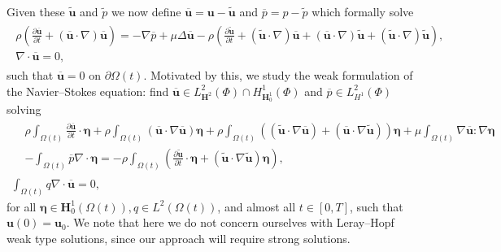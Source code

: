 \documentclass[a4paper]{amsart}
\numberwithin{equation}{section}
\newcommand{\ddt}[1]{\frac{\partial #1}{\partial t}}
\newcommand{\grad}{\nabla}
\newcommand{\Div}{\nabla \cdot}
\theoremstyle{plain}
\newcommand{\mbf}[1]{\mathbf{#1}}
\begin{document}
Given these $\widetilde{\mbf{u}}$ and $\widetilde{p}$ we now define $\overline{\mbf{u}} = \mbf{u} - \widetilde{\mbf{u}}$ and $\overline{p} = p - \widetilde{p}$ which formally solve
\begin{gather}
	\begin{gathered}
		\rho \left( \ddt{\overline{\mbf{u}}} + (\overline{\mbf{u}} \cdot \grad)\overline{\mbf{u}}\right) = - \grad \overline{p}+ \mu \Delta \overline{\mbf{u}} - \rho \left(\ddt{\widetilde{\mbf{u}}} + (\widetilde{\mbf{u}} \cdot \grad) \overline{\mbf{u}} + (\overline{\mbf{u}} \cdot \grad)\widetilde{\mbf{u}} + (\widetilde{\mbf{u}} \cdot \grad) \widetilde{\mbf{u}}\right),\\
		\Div \overline{\mbf{u}} = 0,
	\end{gathered}
	\label{eqn: evolving NS2}
\end{gather}
such that $\overline{\mbf{u}} = 0$ on $\partial \Omega(t)$.
Motivated by this, we study the weak formulation of the Navier--Stokes equation: find $\overline{\mbf{u}} \in L^2_{\mbf{H}^2}(\Phi) \cap H^1_{\mbf{H}_0^{1}}(\Phi)$ and $\overline{p} \in L^2_{H^1}(\Phi)$ solving
\begin{gather}
	\begin{aligned}
    &\rho \int_{\Omega(t)}\ddt{\overline{\mbf{u}}} \cdot  \boldsymbol{\eta} + \rho \int_{\Omega(t)} \left(\overline{\mbf{u}}\cdot \grad \overline{\mbf{u}}\right) \boldsymbol{\eta} + \rho \int_{\Omega(t)} \left((\widetilde{\mbf{u}} \cdot \grad \overline{\mbf{u}}) + (\overline{\mbf{u}} \cdot \grad\widetilde{\mbf{u}}) \right)\boldsymbol{\eta} + \mu \int_{\Omega(t)} \grad\overline{\mbf{u}} : \grad \boldsymbol{\eta}\\
    &- \int_{\Omega(t)} \overline{p} \Div \boldsymbol{\eta} = -\rho \int_{\Omega(t)} \left(\ddt{\widetilde{\mbf{u}}} \cdot \boldsymbol{\eta} + (\widetilde{\mbf{u}} \cdot \grad \widetilde{\mbf{u}}) \boldsymbol{\eta}\right),
    \end{aligned}\label{eqn: weakNS}\\
    \int_{\Omega(t)} q \Div \overline{\mbf{u}} = 0, \label{eqn: weakNS2}
\end{gather}
for all $\boldsymbol{\eta} \in \mbf{H}_0^1(\Omega(t)), q \in L^2(\Omega(t))$, and almost all $t \in [0,T]$, such that $\mbf{u}(0) = \mbf{u}_0$.
We note that here we do not concern ourselves with Leray--Hopf weak type solutions, since our approach will require strong solutions.
\end{document}
